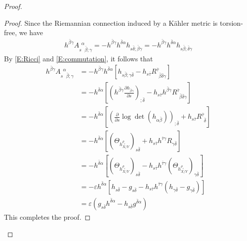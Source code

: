 \documentclass{amsart}
\theoremstyle{definition}
\numberwithin{equation}{section}
\begin{document}
\begin{proof}
\begin{proof}
Since  the Riemannian connection induced by a K\"{a}hler metric is torsion-free, we have
\begin{align*}
h^{\bar\beta\gamma}A{_{{s}\phantom{{\alpha}}{\bar\beta;\gamma}}^{\phantom{{s}}{\alpha}}}
	= -h^{\bar\beta\gamma}h^{\bar\delta\alpha}h_{s\bar\delta;\bar\beta\gamma} 
	= -h^{\bar\beta\gamma}h^{\bar\delta\alpha}h_{s\bar\beta;\bar\delta\gamma}
\end{align*}
By \eqref{E:Ricci} and \eqref{E:commutation}, it follows that
\begin{align*}
h^{\bar\beta\gamma}A{_{{s}\phantom{{\alpha}}{\bar\beta;\gamma}}^{\phantom{{s}}{\alpha}}}
&=
	 -h^{\bar\beta\gamma}h^{\bar\delta\alpha}
	{\left[{h_{s\bar\beta;\gamma\bar\delta}
	-h_{s\bar\tau}R{_{{}\phantom{{\bar\tau}}{\bar\beta\bar\delta\gamma}}^{\phantom{{}}{\bar\tau}}}
	}\right]} 
	\\
&=
	-h^{\bar\delta\alpha}
	{\left[{
	{\left({h^{\bar\beta\gamma}{\frac{\partial{h_{\bar\beta\gamma}}}{\partial{s}}}}\right)}_{;\bar\delta}
	-h_{s\bar\tau}h^{\bar\beta\gamma}R{_{{}\phantom{{\bar\tau}}{\bar\beta\bar\delta\gamma}}^{\phantom{{}}{\bar\tau}}}
	}\right]}
	\\
&=
	-h^{\bar\delta\alpha}
	{\left[{
	{\left({{\frac{\partial{}}{\partial{s}}}\log\det(h_{\alpha\bar\beta})}\right)}_{;\bar\delta}
	+h_{s\bar\tau}R{_{{}\phantom{{\bar\tau}}{\bar\delta}}^{\phantom{{}}{\bar\tau}}}
	}\right]} 
	\\
&=
	-h^{\bar\delta\alpha}
	{\left[{
	(\Theta_{h^{\rho_{\varepsilon}}_{X/Y}})_{s\bar\delta}
	+h_{s\bar\tau}h^{\bar\tau\gamma}R_{\gamma\bar\delta}
	}\right]} 
	\\
&=
	-h^{\bar\delta\alpha}
	{\left[{
	(\Theta_{h^{\rho_{\varepsilon}}_{X/Y}})_{s\bar\delta}
	-h_{s\bar\tau}h^{\bar\tau\gamma}(\Theta_{h^{\rho_{\varepsilon}}_{X/Y}})_{\gamma\bar\delta}
	}\right]} 
	\\
&=
	-\varepsilon
	h^{\bar\delta\alpha}
	{\left[{
	h_{s\bar\delta}-g_{s\bar\delta}
	-h_{s\bar\tau}h^{\bar\tau\gamma}
	{\left({h_{\gamma\bar\delta}-g_{\gamma\bar\delta}}\right)}
	}\right]}
	\\
	&=
	\varepsilon
	{\left({
		g_{s\bar\delta}h^{\bar\delta\alpha}
		-h_{s\bar\delta}g^{\bar\delta\alpha}
	}\right)}
\end{align*}
This completes the proof.
\end{proof}


\end{proof}
\end{document}

